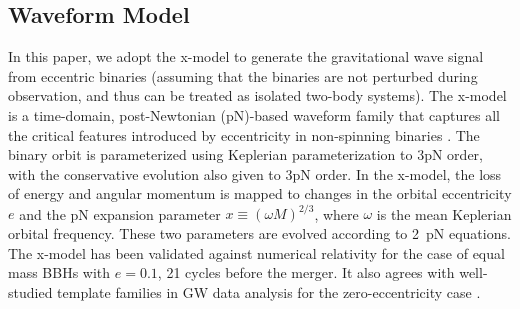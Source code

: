 \documentclass[%
 reprint,
 amsmath,amssymb,
 aps,
]{revtex4-2}
\begin{document}
\subsection{Waveform Model}\label{sec:waveform_model}

In this paper, we adopt the x-model \citep{Hinder+10} to generate the gravitational wave signal from eccentric binaries (assuming that the binaries are not perturbed during observation, and thus can be treated as isolated two-body systems). The x-model is a time-domain, post-Newtonian (pN)-based waveform family that captures all the critical features introduced by eccentricity in non-spinning binaries \citep{Huerta+14}. The binary orbit is parameterized using Keplerian parameterization to 3pN order, with the conservative evolution also given to 3pN order. In the x-model, the loss of energy and angular momentum is mapped to changes in the orbital eccentricity $e$ and the pN expansion parameter $x \equiv (\omega M)^{2/3}$, where $\omega$ is the mean Keplerian orbital frequency. These two parameters are evolved according to 2~pN equations. The x-model has been validated against numerical relativity for the case of equal mass BBHs with $e=0.1$, 21 cycles before the merger. It also agrees with well-studied template families in GW data analysis for the zero-eccentricity case \citep{Brown+10}.
\end{document}
